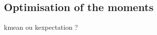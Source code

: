 \documentclass[preprint, 1p]{elsarticle}
\newcommand{\arthur}[1]{{\itshape\color{cyan} ({#1})}}
\begin{document}





\subsection{Optimisation of the moments}

%

{\color{red} kmean ou kexpectation ?}
\end{document}
